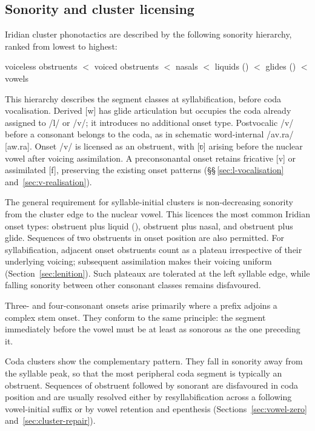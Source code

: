 \subsection{Sonority and cluster licensing}\label{sec:sonority}

Iridian cluster phonotactics are described by the following sonority hierarchy,
ranked from lowest to highest:

\begin{center}
voiceless obstruents $<$ voiced obstruents $<$ nasals $<$ liquids () $<$
glides () $<$ vowels
\end{center}

This hierarchy describes the segment classes at syllabification, before
coda vocalisation. Derived [w] has glide articulation but occupies the
coda already assigned to /l/ or /v/; it introduces no additional onset
type. Postvocalic /v/ before a consonant belongs to the coda, as in
schematic word-internal /av.ra/ [aw.ra]. Onset /v/ is licensed as an obstruent, with [ʋ]
arising before the nuclear vowel after voicing assimilation. A preconsonantal
onset retains fricative [v] or assimilated [f], preserving the existing
onset patterns (§§\,\ref{sec:l-vocalisation} and~\ref{sec:v-realisation}).

The general requirement for syllable-initial clusters is non-decreasing sonority
from the cluster edge to the nuclear vowel. This licences the most common Iridian
onset types: obstruent plus liquid (), obstruent plus nasal, and
obstruent plus glide. Sequences of two obstruents in onset position are also
permitted. For syllabification, adjacent onset obstruents count as a plateau
irrespective of their underlying voicing; subsequent assimilation makes their
voicing uniform (Section~\ref{sec:lenition}). Such plateaux are tolerated
at the left syllable edge, while falling sonority between other consonant
classes remains disfavoured.

Three- and four-consonant onsets arise primarily where a prefix adjoins a complex
stem onset. They conform to the same principle: the segment immediately before the
vowel must be at least as sonorous as the one preceding it.

Coda clusters show the complementary pattern. They fall in sonority away from the
syllable peak, so that the most peripheral coda segment is typically an obstruent.
Sequences of obstruent followed by sonorant are disfavoured in coda position and
are usually resolved either by resyllabification across a following vowel-initial
suffix or by vowel retention and epenthesis
(Sections~\ref{sec:vowel-zero} and~\ref{sec:cluster-repair}).

